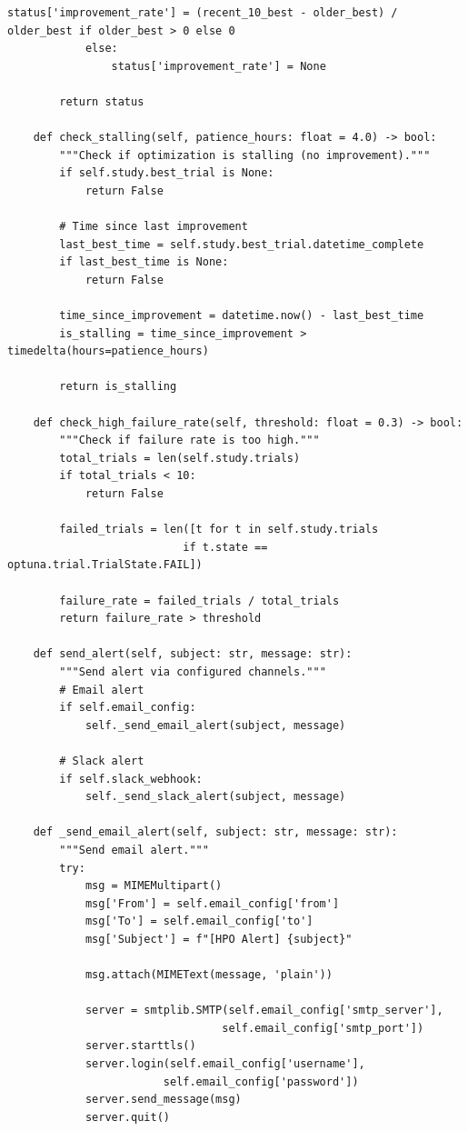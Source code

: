 \begin{lstlisting}[style=python, caption=Monitoring and alerting for production HPO]
                status['improvement_rate'] = (recent_10_best - older_best) / older_best if older_best > 0 else 0
            else:
                status['improvement_rate'] = None

        return status

    def check_stalling(self, patience_hours: float = 4.0) -> bool:
        """Check if optimization is stalling (no improvement)."""
        if self.study.best_trial is None:
            return False

        # Time since last improvement
        last_best_time = self.study.best_trial.datetime_complete
        if last_best_time is None:
            return False

        time_since_improvement = datetime.now() - last_best_time
        is_stalling = time_since_improvement > timedelta(hours=patience_hours)

        return is_stalling

    def check_high_failure_rate(self, threshold: float = 0.3) -> bool:
        """Check if failure rate is too high."""
        total_trials = len(self.study.trials)
        if total_trials < 10:
            return False

        failed_trials = len([t for t in self.study.trials
                           if t.state == optuna.trial.TrialState.FAIL])

        failure_rate = failed_trials / total_trials
        return failure_rate > threshold

    def send_alert(self, subject: str, message: str):
        """Send alert via configured channels."""
        # Email alert
        if self.email_config:
            self._send_email_alert(subject, message)

        # Slack alert
        if self.slack_webhook:
            self._send_slack_alert(subject, message)

    def _send_email_alert(self, subject: str, message: str):
        """Send email alert."""
        try:
            msg = MIMEMultipart()
            msg['From'] = self.email_config['from']
            msg['To'] = self.email_config['to']
            msg['Subject'] = f"[HPO Alert] {subject}"

            msg.attach(MIMEText(message, 'plain'))

            server = smtplib.SMTP(self.email_config['smtp_server'],
                                 self.email_config['smtp_port'])
            server.starttls()
            server.login(self.email_config['username'],
                        self.email_config['password'])
            server.send_message(msg)
            server.quit()


\end{lstlisting}
